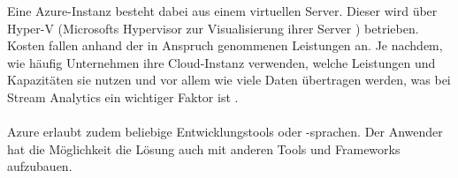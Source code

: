 Eine Azure-Instanz besteht dabei aus einem virtuellen Server. Dieser wird über Hyper-V (Microsofts Hypervisor zur Visualisierung ihrer Server \cite{searchdatacenter.2017}) betrieben. Kosten fallen anhand der in Anspruch genommenen Leistungen an. Je nachdem, wie häufig Unternehmen ihre Cloud-Instanz verwenden, welche Leistungen und Kapazitäten sie nutzen und vor allem wie viele Daten übertragen werden, was bei Stream Analytics ein wichtiger Faktor ist \cite{PeterTsai.2016}.\\ \\
Azure erlaubt zudem beliebige Entwicklungstools oder -sprachen. Der Anwender hat die Möglichkeit die Lösung auch mit anderen Tools und Frameworks aufzubauen. 
